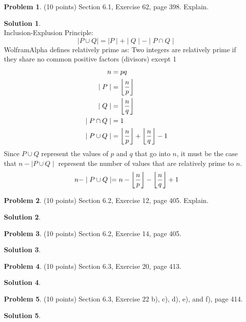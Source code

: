 \documentclass{article}
\DeclarePairedDelimiter\floor{\lfloor}{\rfloor}
\theoremstyle{definition}
\newtheorem{problem}{Problem}
\newtheorem*{solution}{Solution}
\begin{document}
\begin{problem} (10 points) 
Section 6.1, Exercise 62, page 398.  Explain.
\end{problem}
\begin{solution}\ \\
Inclusion-Explusion Principle:
$$\mid P \cup Q \mid = \mid P \mid + \mid Q \mid - \mid P \cap Q \mid$$
WolframAlpha defines relatively prime as: Two integers are relatively prime if they share no common positive factors (divisors) except 1
\begin{align*}
  n &= pq\\
  \mid P \mid &= \floor*{\dfrac{n}{p}} \\
  \mid Q \mid &= \floor*{\dfrac{n}{q}} \\
  \mid P \cap Q \mid &= 1 \\
  \mid P \cup Q \mid &= \floor*{\dfrac{n}{p}} + \floor*{\dfrac{n}{q}} - 1
\end{align*}
Since $P \cup Q$ represent the values of $p$ and $q$ that go into $n$, it must be the case that $n - \mid P \cup Q \mid$ represent the number of values that are relatively prime to $n$.
$$ n - \mid P \cup Q \mid = n - \floor*{\dfrac{n}{p}} - \floor*{\dfrac{n}{q}} + 1$$
\end{solution}

\begin{problem} (10 points) 
Section 6.2, Exercise 12, page 405.  Explain.
\end{problem}
\begin{solution} 
\end{solution}

\begin{problem} (10 points) 
Section 6.2, Exercise 14, page 405.
\end{problem}
\begin{solution} 
\end{solution}

\begin{problem} (10 points) 
Section 6.3, Exercise 20, page 413.
\end{problem}
\begin{solution} 
\end{solution}

\begin{problem} (10 points) 
Section 6.3, Exercise 22 b), c), d), e), and f), page 414.
\end{problem}
\begin{solution} 
\end{solution}
\end{document}
